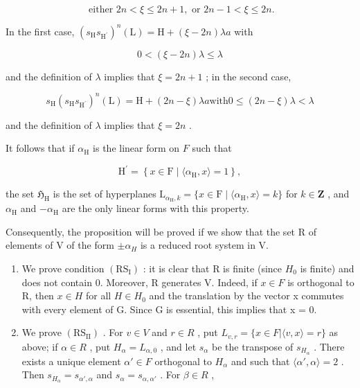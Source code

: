 \[
\text { either } 2 n <   \xi \leqslant 2 n + 1, \text { or } 2 n - 1 <   \xi \leqslant 2 n.
\]

In the first case, \((s_{\mathrm{H}}s_{\mathrm{H}^{\prime}})^{n}(\mathrm{L}) = \mathrm{H} + (\xi -2n)\lambda a\) with

\[
0 <   (\xi - 2 n) \lambda \leqslant \lambda
\]

and the definition of \(\lambda\) implies that \(\xi = 2n + 1\) ; in the second case,

\[
s _ {\mathrm{H}} (s _ {\mathrm{H}} s _ {\mathrm {H^ {\prime}}}) ^ {n} (\mathrm{L}) = \mathrm{H} + (2 n - \xi) \lambda a \text {with} 0 \leqslant (2 n - \xi) \lambda <   \lambda
\]

and the definition of \(\lambda\) implies that \(\xi = 2n\) .

It follows that if \(\alpha_{\mathrm{H}}\) is the linear form on \(F\) such that

\[
\mathrm{H} ^ {\prime} = \left\{x \in \mathrm{F} \mid \langle \alpha_ {\mathrm{H}}, x \rangle = 1 \right\},
\]

the set \(\mathfrak{H}_{\mathrm{H}}\) is the set of hyperplanes \(\mathrm{L}_{\alpha_{\mathrm{H}},k} = \{x\in \mathrm{F}\mid \langle \alpha_{\mathrm{H}},x\rangle = k\}\) for \(k\in \mathbf{Z}\) , and \(\alpha_{\mathrm{H}}\) and \(-\alpha_{\mathrm{H}}\) are the only linear forms with this property.

Consequently, the proposition will be proved if we show that the set R of elements of V of the form \(\pm\alpha_{H}\) is a reduced root system in V.

\begin{enumerate}
\def\labelenumi{\alph{enumi})}
\item
  We prove condition \((\mathrm{RS}_{\mathrm{I}})\) : it is clear that R is finite (since \(H_{0}\) is finite) and does not contain 0. Moreover, R generates V. Indeed, if \(x \in F\) is orthogonal to R, then \(x \in H\) for all \(H \in H_{0}\) and the translation by the vector x commutes with every element of G. Since G is essential, this implies that x = 0.
\item
  We prove \((\mathrm{RS}_{\mathrm{II}})\) . For \(v \in V\) and \(r \in R\) , put \(L_{v,r} = \{x \in F | \langle v, x \rangle = r\}\) as above; if \(\alpha \in R\) , put \(H_{\alpha} = L_{\alpha,0}\) , and let \(s_{\alpha}\) be the transpose of \(s_{H_{\alpha}}\) . There exists a unique element \(\alpha' \in F\) orthogonal to \(H_{\alpha}\) and such that \(\langle \alpha', \alpha \rangle = 2\) . Then \(s_{H_{\alpha}} = s_{\alpha', \alpha}\) and \(s_{\alpha} = s_{\alpha, \alpha'}\) . For \(\beta \in R\) ,
\end{enumerate}

